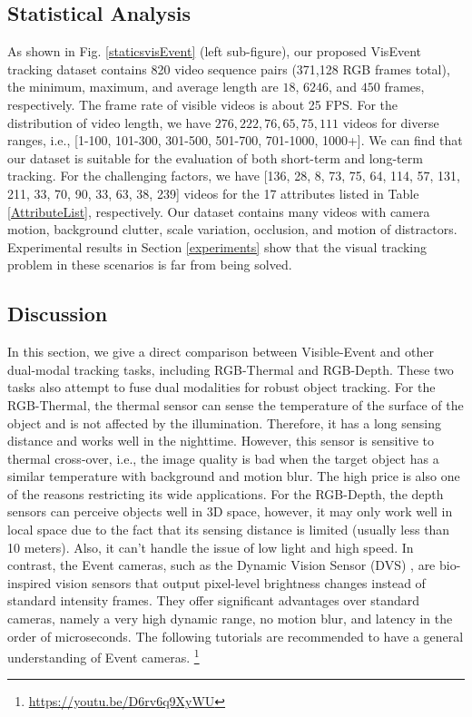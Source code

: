 \documentclass[journal]{IEEEtran}
\begin{document}
\subsection{Statistical Analysis} 
As shown in Fig. \ref{staticsvisEvent} (left sub-figure), our proposed VisEvent tracking dataset contains 820 video sequence pairs (371,128 RGB frames total), the minimum, maximum, and average length are $18$, $6246$, and $450$ frames, respectively. The frame rate of visible videos is about 25 FPS.  
For the distribution of video length, we have $276, 222, 76, 65, 75, 111$ videos for diverse ranges, i.e., [1-100, 101-300, 301-500, 501-700, 701-1000, 1000+]. We can find that our dataset is suitable for the evaluation of both short-term and long-term tracking. 
For the challenging factors, we have [136, 28, 8, 73, 75, 64, 114, 57, 131, 211, 33, 70, 90, 33, 63, 38, 239] videos for the 17 attributes listed in Table \ref{AttributeList}, respectively. Our dataset contains many videos with camera motion, background clutter, scale variation, occlusion, and motion of distractors. Experimental results in Section \ref{experiments} show that the visual tracking problem in these scenarios is far from being solved.











\subsection{Discussion}
In this section, we give a direct comparison between Visible-Event and other dual-modal tracking tasks, including RGB-Thermal and RGB-Depth. These two tasks also attempt to fuse dual modalities for robust object tracking. For the RGB-Thermal, the thermal sensor can sense the temperature of the surface of the object and is not affected by the illumination. Therefore, it has a long sensing distance and works well in the nighttime. However, this sensor is sensitive to thermal cross-over, i.e., the image quality is bad when the target object has a similar temperature with background and motion blur. The high price is also one of the reasons restricting its wide applications. For the RGB-Depth, the depth sensors can perceive objects well in 3D space, however, it may only work well in local space due to the fact that its sensing distance is limited (usually less than 10 meters). Also, it can't handle the issue of low light and high speed. In contrast, the Event cameras, such as the Dynamic Vision Sensor (DVS) \cite{2008dvs}, are bio-inspired vision sensors that output pixel-level brightness changes instead of standard intensity frames. They offer significant advantages over standard cameras, namely a very high dynamic range, no motion blur, and latency in the order of microseconds. The following tutorials are recommended to have a general understanding of Event cameras. \footnote{\url{https://youtu.be/D6rv6q9XyWU}}
\end{document}
